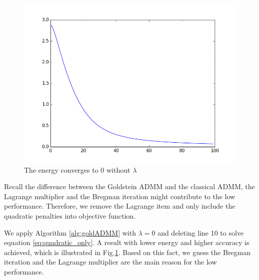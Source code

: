 \documentclass[letterpaper, 10 pt, conference]{ieeeconf}  %
\begin{document}
\begin{figure}
\centering
\includegraphics[width=\columnwidth]{figure/energy_no_lambda.png}
\caption{The energy converges to 0 without $\lambda$}
\label{fig:energyWithoutLambda}
\end{figure}

Recall the difference between the Goldstein ADMM and the classical ADMM, the Lagrange multiplier and the Bregman iteration might contribute to the low performance. Therefore, we remove the Lagrange item and only include the quadratic penalties into objective function.

We apply Algorithm \ref{alg:goldADMM} with $\lambda=0$ and deleting line 10 to solve equation \eqref{eq:quadratic_only}. A result with lower energy and higher accuracy is achieved, which is illustrated in Fig.\ref{fig:energyWithoutLambda}. Based on this fact, we guess the Bregman iteration and the Lagrange multiplier are the main reason for the low performance.
\end{document}
